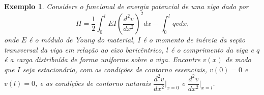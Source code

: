 \documentclass[
	12pt,				%
	openright,			%
    twoside,			%
	a4paper,			%
	chapter=TITLE,		%
	english,			%
	french,				%
	spanish,			%
	brazil				%
	]{abntex2}
\newtheorem{exemplo}{Exemplo}
\numberwithin{lema}{chapter}
\numberwithin{teorema}{chapter}
\numberwithin{definicao}{chapter}
\numberwithin{exemplo}{chapter}
\numberwithin{figure}{chapter}
\begin{document}
\begin{exemplo}
	\label{ex:cond_contorno}\cite{mefassan}
	Considere o funcional de energia potencial de uma viga dado por
	\begin{equation}
		\label{eqn:cap_calc_var:funcional_pi}
		\Pi = \frac{1}{2}	\int_{0}^{l}
			EI \left (
				\frac{d^2v}{dx^2}
			\right )^2 dx
			-
			\int_{0}^{l} qv dx
			\text{,}
	\end{equation}
	onde $E$ é o módulo de Young do material, $I$ é o momento de inércia da seção transversal da viga em relação ao eixo baricêntrico, $l$ é o comprimento da viga e $q$ é a carga distribuída de forma uniforme sobre a viga. Encontre $v(x)$ de modo que $I$ seja estacionário, com as condições de contorno essenciais, $v(0)=0$ e $v(l)=0$, e as condições de contorno naturais $\dfrac{d^2v}{dx^2}\Big |_{x=0}$ e $\dfrac{d^2v}{dx^2}\Big |_{x=l}$.
\end{exemplo}
\end{document}
